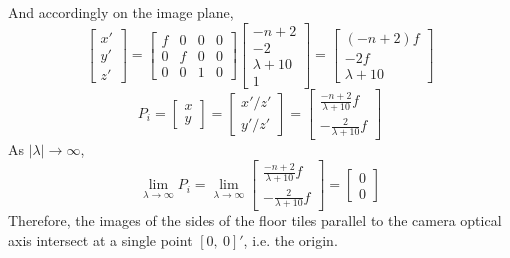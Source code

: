 \documentclass[12pt]{article}
\begin{document}
And accordingly on the image plane,
\begin{equation*}
\left[ \begin{array}{c}
x'\\
y'\\
z'
\end{array} \right ] = \left[ \begin{array}{cccc}
f & 0 & 0 & 0\\
0 & f & 0 & 0\\
0 & 0 & 1 & 0
\end{array} \right ]  \left[ \begin{array}{c}
-n+2\\
-2\\
\lambda + 10\\
1
\end{array} \right ] = \left[ \begin{array}{c}
(-n+2)f\\
-2f\\
\lambda + 10
\end{array} \right ]
\end{equation*}
\begin{equation*}
P_i = \left[ \begin{array}{c}
x\\
y
\end{array} \right ] = \left[ \begin{array}{c}
x'/z'\\
y'/z'
\end{array} \right ] = \left[ \begin{array}{c}
\frac{-n+2}{\lambda + 10}f\\
-\frac{2}{\lambda + 10}f
\end{array} \right ]
\end{equation*}
As $|\lambda| \to \infty$,
\begin{equation*}
\lim\limits_{\lambda\to\infty}P_i = \lim\limits_{\lambda\to\infty}\left[ \begin{array}{c}
\frac{-n+2}{\lambda + 10}f\\
-\frac{2}{\lambda + 10}f
\end{array} \right ] = \left[ \begin{array}{c}
0\\
0
\end{array} \right ]
\end{equation*}
Therefore, the images of the sides of the floor tiles parallel to the camera optical axis intersect at a single point $[0,\ 0]'$, i.e. the origin.
\vfill
\clearpage
\end{document}

